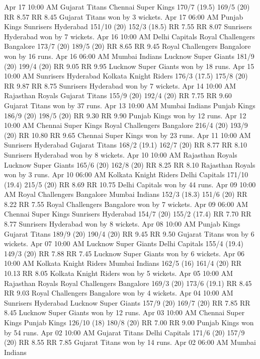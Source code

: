 Apr 17
10:00 AM
Gujarat Titans
Chennai Super Kings
170/7 (19.5)
169/5 (20)
RR 8.57
RR 8.45
Gujarat Titans won by 3 wickets.
Apr 17
06:00 AM
Punjab Kings
Sunrisers Hyderabad
151/10 (20)
152/3 (18.5)
RR 7.55
RR 8.07
Sunrisers Hyderabad won by 7 wickets.
Apr 16
10:00 AM
Delhi Capitals
Royal Challengers Bangalore
173/7 (20)
189/5 (20)
RR 8.65
RR 9.45
Royal Challengers Bangalore won by 16 runs.
Apr 16
06:00 AM
Mumbai Indians
Lucknow Super Giants
181/9 (20)
199/4 (20)
RR 9.05
RR 9.95
Lucknow Super Giants won by 18 runs.
Apr 15
10:00 AM
Sunrisers Hyderabad
Kolkata Knight Riders
176/3 (17.5)
175/8 (20)
RR 9.87
RR 8.75
Sunrisers Hyderabad won by 7 wickets.
Apr 14
10:00 AM
Rajasthan Royals
Gujarat Titans
155/9 (20)
192/4 (20)
RR 7.75
RR 9.60
Gujarat Titans won by 37 runs.
Apr 13
10:00 AM
Mumbai Indians
Punjab Kings
186/9 (20)
198/5 (20)
RR 9.30
RR 9.90
Punjab Kings won by 12 runs.
Apr 12
10:00 AM
Chennai Super Kings
Royal Challengers Bangalore
216/4 (20)
193/9 (20)
RR 10.80
RR 9.65
Chennai Super Kings won by 23 runs.
Apr 11
10:00 AM
Sunrisers Hyderabad
Gujarat Titans
168/2 (19.1)
162/7 (20)
RR 8.77
RR 8.10
Sunrisers Hyderabad won by 8 wickets.
Apr 10
10:00 AM
Rajasthan Royals
Lucknow Super Giants
165/6 (20)
162/8 (20)
RR 8.25
RR 8.10
Rajasthan Royals won by 3 runs.
Apr 10
06:00 AM
Kolkata Knight Riders
Delhi Capitals
171/10 (19.4)
215/5 (20)
RR 8.69
RR 10.75
Delhi Capitals won by 44 runs.
Apr 09
10:00 AM
Royal Challengers Bangalore
Mumbai Indians
152/3 (18.3)
151/6 (20)
RR 8.22
RR 7.55
Royal Challengers Bangalore won by 7 wickets.
Apr 09
06:00 AM
Chennai Super Kings
Sunrisers Hyderabad
154/7 (20)
155/2 (17.4)
RR 7.70
RR 8.77
Sunrisers Hyderabad won by 8 wickets.
Apr 08
10:00 AM
Punjab Kings
Gujarat Titans
189/9 (20)
190/4 (20)
RR 9.45
RR 9.50
Gujarat Titans won by 6 wickets.
Apr 07
10:00 AM
Lucknow Super Giants
Delhi Capitals
155/4 (19.4)
149/3 (20)
RR 7.88
RR 7.45
Lucknow Super Giants won by 6 wickets.
Apr 06
10:00 AM
Kolkata Knight Riders
Mumbai Indians
162/5 (16)
161/4 (20)
RR 10.13
RR 8.05
Kolkata Knight Riders won by 5 wickets.
Apr 05
10:00 AM
Rajasthan Royals
Royal Challengers Bangalore
169/3 (20)
173/6 (19.1)
RR 8.45
RR 9.03
Royal Challengers Bangalore won by 4 wickets.
Apr 04
10:00 AM
Sunrisers Hyderabad
Lucknow Super Giants
157/9 (20)
169/7 (20)
RR 7.85
RR 8.45
Lucknow Super Giants won by 12 runs.
Apr 03
10:00 AM
Chennai Super Kings
Punjab Kings
126/10 (18)
180/8 (20)
RR 7.00
RR 9.00
Punjab Kings won by 54 runs.
Apr 02
10:00 AM
Gujarat Titans
Delhi Capitals
171/6 (20)
157/9 (20)
RR 8.55
RR 7.85
Gujarat Titans won by 14 runs.
Apr 02
06:00 AM
Mumbai Indians
